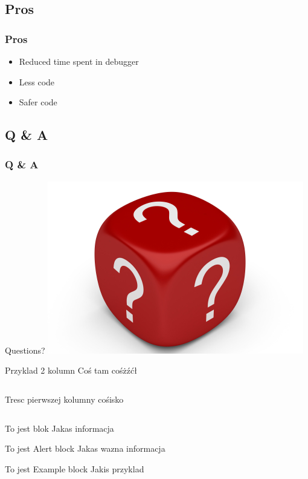 \documentclass{beamer}
\begin{document}
\subsection{Pros}
\begin{frame}
\frametitle{Pros}
\begin{itemize}
  \item Reduced time spent in debugger
  \item Less code
  \item Safer code
\end{itemize}
\end{frame}


\subsection{Q \& A}
\begin{frame}
\frametitle{Q \& A}
\begin{center}
\Huge Questions?
\includegraphics[scale=0.45]{dice_questions}
\end{center}
\end{frame}



\begin{frame}{Przyklad 2 kolumn}
Coś tam cośżźćł
\begin{columns}[t] %
Tresc pierwszej kolumny
cośisko
\end{columns}
\end{frame}

\begin{frame}
\begin{block}{To jest blok}
Jakas informacja
\end{block}

\begin{alertblock}{To jest Alert block}
Jakas wazna informacja
\end{alertblock}

\begin{exampleblock}{To jest Example block}
Jakis przyklad
\end{exampleblock}
\end{frame}
\end{document}
